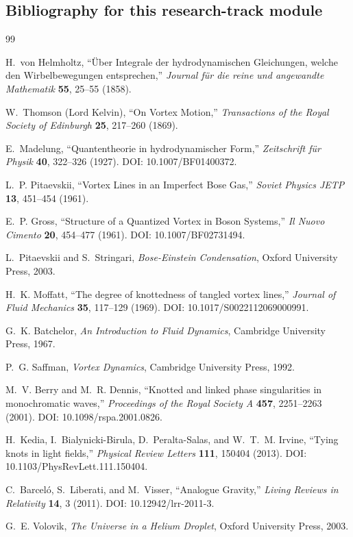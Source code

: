 \subsection{Bibliography for this research-track module}
\label{subsec:ctim-bibliography}

\begin{thebibliography}{99}

H.~von Helmholtz,
``Über Integrale der hydrodynamischen Gleichungen, welche den Wirbelbewegungen entsprechen,''
\emph{Journal für die reine und angewandte Mathematik} \textbf{55}, 25--55 (1858).

W.~Thomson (Lord Kelvin),
``On Vortex Motion,''
\emph{Transactions of the Royal Society of Edinburgh} \textbf{25}, 217--260 (1869).

E.~Madelung,
``Quantentheorie in hydrodynamischer Form,''
\emph{Zeitschrift für Physik} \textbf{40}, 322--326 (1927).
DOI: 10.1007/BF01400372.

L.~P. Pitaevskii,
``Vortex Lines in an Imperfect Bose Gas,''
\emph{Soviet Physics JETP} \textbf{13}, 451--454 (1961).

E.~P. Gross,
``Structure of a Quantized Vortex in Boson Systems,''
\emph{Il Nuovo Cimento} \textbf{20}, 454--477 (1961).
DOI: 10.1007/BF02731494.

L.~Pitaevskii and S.~Stringari,
\emph{Bose-Einstein Condensation},
Oxford University Press, 2003.

H.~K. Moffatt,
``The degree of knottedness of tangled vortex lines,''
\emph{Journal of Fluid Mechanics} \textbf{35}, 117--129 (1969).
DOI: 10.1017/S0022112069000991.

G.~K. Batchelor,
\emph{An Introduction to Fluid Dynamics},
Cambridge University Press, 1967.

P.~G. Saffman,
\emph{Vortex Dynamics},
Cambridge University Press, 1992.

M.~V. Berry and M.~R. Dennis,
``Knotted and linked phase singularities in monochromatic waves,''
\emph{Proceedings of the Royal Society A} \textbf{457}, 2251--2263 (2001).
DOI: 10.1098/rspa.2001.0826.

H.~Kedia, I.~Bialynicki-Birula, D.~Peralta-Salas, and W.~T.~M. Irvine,
``Tying knots in light fields,''
\emph{Physical Review Letters} \textbf{111}, 150404 (2013).
DOI: 10.1103/PhysRevLett.111.150404.

C.~Barceló, S.~Liberati, and M.~Visser,
``Analogue Gravity,''
\emph{Living Reviews in Relativity} \textbf{14}, 3 (2011).
DOI: 10.12942/lrr-2011-3.

G.~E. Volovik,
\emph{The Universe in a Helium Droplet},
Oxford University Press, 2003.

\end{thebibliography}
